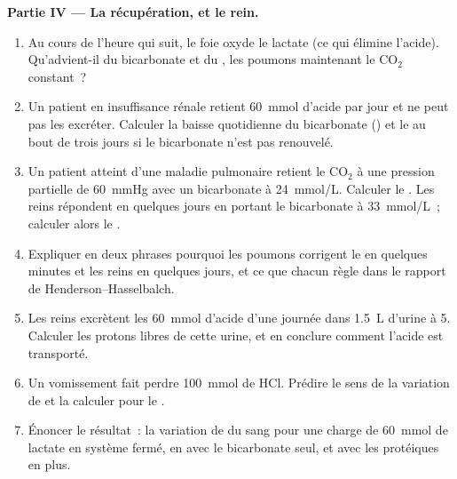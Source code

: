 \begin{problem}
\medskip
\noindent\textbf{Partie IV --- La récupération, et le rein.}
\begin{enumerate}[resume]
  \item Au cours de l'heure qui suit, le foie oxyde le lactate (ce qui
        élimine l'acide). Qu'advient-il du bicarbonate et du , les
        poumons maintenant le $\mathrm{CO_2}$ constant~?
  \item Un patient en insuffisance rénale retient \qty{60}{mmol} d'acide
        par jour et ne peut pas les excréter. Calculer la baisse
        quotidienne du bicarbonate () et le  au bout de
        trois jours si le bicarbonate n'est pas renouvelé.
  \item Un patient atteint d'une maladie pulmonaire retient le
        $\mathrm{CO_2}$ à une pression partielle de \qty{60}{mmHg} avec
        un bicarbonate à \qty{24}{mmol/L}. Calculer le . Les reins
        répondent en quelques jours en portant le bicarbonate à
        \qty{33}{mmol/L}~; calculer alors le .
  \item Expliquer en deux phrases pourquoi les poumons corrigent le 
        en quelques minutes et les reins en quelques jours, et ce que
        chacun règle dans le rapport de Henderson--Hasselbalch.
  \item Les reins excrètent les \qty{60}{mmol} d'acide d'une journée
        dans \qty{1.5}{L} d'urine à  5. Calculer les protons libres de
        cette urine, et en conclure comment l'acide est transporté.
  \item Un vomissement fait perdre \qty{100}{mmol} de HCl. Prédire le
        sens de la variation de  et la calculer pour le .
  \item Énoncer le résultat~: la variation de  du sang pour une charge
        de \qty{60}{mmol} de lactate en système fermé, en 
        avec le bicarbonate seul, et avec les  protéiques en plus.
\end{enumerate}
\end{problem}
